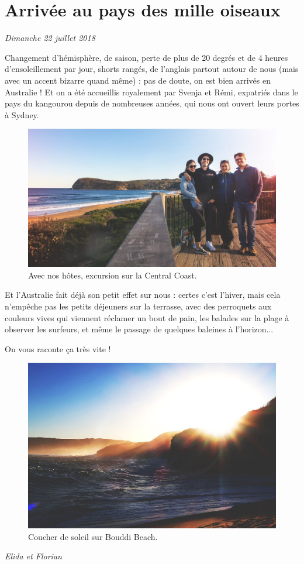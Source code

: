 \hypertarget{arrivuxe9e-au-pays-des-mille-oiseaux}{%
\section{Arrivée au pays des mille
oiseaux}\label{arrivuxe9e-au-pays-des-mille-oiseaux}}

\emph{Dimanche 22 juillet 2018}

Changement d'hémisphère, de saison, perte de plus de 20 degrés et de 4
heures d'ensoleillement par jour, shorts rangés, de l'anglais partout
autour de nous (mais avec un accent bizarre quand même) : pas de doute,
on est bien arrivés en Australie ! Et on a été accueillis royalement par
Svenja et Rémi, expatriés dans le pays du kangourou depuis de nombreuses
années, qui nous ont ouvert leurs portes à Sydney.

\begin{figure}
\centering
\includegraphics{images/20180724_australie.jpg}
\caption{Avec nos hôtes, excursion sur la Central Coast.}
\end{figure}

Et l'Australie fait déjà son petit effet sur nous : certes c'est
l'hiver, mais cela n'empêche pas les petits déjeuners sur la terrasse,
avec des perroquets aux couleurs vives qui viennent réclamer un bout de
pain, les balades sur la plage à observer les surfeurs, et même le
passage de quelques baleines à l'horizon...

On vous raconte ça très vite !

\begin{figure}
\centering
\includegraphics{images/20180724_plage.jpg}
\caption{Coucher de soleil sur Bouddi Beach.}
\end{figure}

\emph{Elida et Florian}
